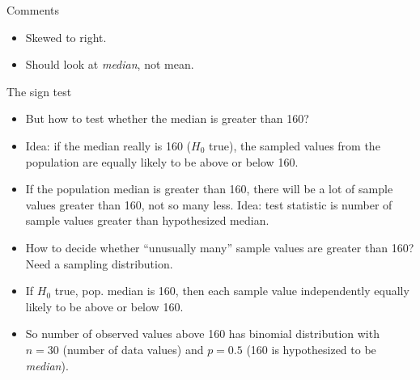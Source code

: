 \documentclass[ignorenonframetext,]{beamer}
\providecommand{\tightlist}{%
  \setlength{\itemsep}{0pt}\setlength{\parskip}{0pt}}
\begin{document}
\begin{frame}{Comments}
\protect\hypertarget{comments-5}{}

\begin{itemize}
\tightlist
\item
  Skewed to right.
\item
  Should look at \emph{median}, not mean.
\end{itemize}

\end{frame}

\begin{frame}{The sign test}
\protect\hypertarget{the-sign-test}{}

\begin{itemize}
\tightlist
\item
  But how to test whether the median is greater than 160?
\item
  Idea: if the median really is 160 (\(H_0\) true), the sampled values
  from the population are equally likely to be above or below 160.
\item
  If the population median is greater than 160, there will be a lot of
  sample values greater than 160, not so many less. Idea: test statistic
  is number of sample values greater than hypothesized median.
\item
  How to decide whether ``unusually many'' sample values are greater
  than 160? Need a sampling distribution.
\item
  If \(H_0\) true, pop. median is 160, then each sample value
  independently equally likely to be above or below 160.
\item
  So number of observed values above 160 has binomial distribution with
  \(n = 30\) (number of data values) and \(p = 0.5\) (160 is
  hypothesized to be \emph{median}).
\end{itemize}

\end{frame}
\end{document}
